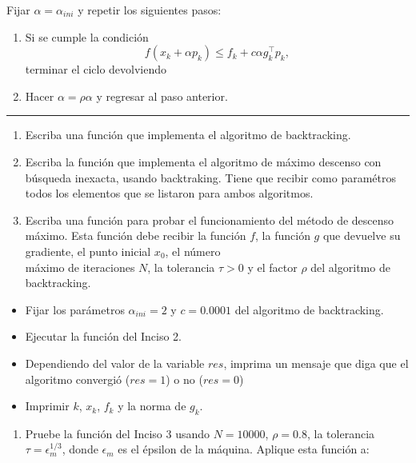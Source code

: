 \documentclass[11pt]{article}
\providecommand{\tightlist}{%
      \setlength{\itemsep}{0pt}\setlength{\parskip}{0pt}}
\begin{document}
Fijar \(\alpha = \alpha_{ini}\) y repetir los siguientes pasos:

\begin{enumerate}
\def\labelenumi{\arabic{enumi}.}
\tightlist
\item
  Si se cumple la condición
  \[ f(x_k+\alpha p_k) \leq f_k + c \alpha g_k^\top p_k, \] terminar el
  ciclo devolviendo
\item
  Hacer \(\alpha = \rho \alpha\) y regresar al paso anterior.
\end{enumerate}

\begin{center}\rule{0.5\linewidth}{0.5pt}\end{center}

\begin{enumerate}
\def\labelenumi{\arabic{enumi}.}
\tightlist
\item
  Escriba una función que implementa el algoritmo de backtracking.
\item
  Escriba la función que implementa el algoritmo de máximo descenso con
  búsqueda inexacta, usando backtraking. Tiene que recibir como
  paramétros todos los elementos que se listaron para ambos algoritmos.
\item
  Escriba una función para probar el funcionamiento del método de
  descenso máximo. Esta función debe recibir la función \(f\), la
  función \(g\) que devuelve su gradiente, el punto inicial \(x_0\), el
  número\\
  máximo de iteraciones \(N\), la tolerancia \(\tau>0\) y el factor
  \(\rho\) del algoritmo de backtracking.
\end{enumerate}

\begin{itemize}
\tightlist
\item
  Fijar los parámetros \(\alpha_{ini}=2\) y \(c=0.0001\) del algoritmo
  de backtracking.
\item
  Ejecutar la función del Inciso 2.
\item
  Dependiendo del valor de la variable \(res\), imprima un mensaje que
  diga que el algoritmo convergió (\(res=1\)) o no (\(res=0\))
\item
  Imprimir \(k\), \(x_k\), \(f_k\) y la norma de \(g_k\).
\end{itemize}

\begin{enumerate}
\def\labelenumi{\arabic{enumi}.}
\setcounter{enumi}{3}
\tightlist
\item
  Pruebe la función del Inciso 3 usando \(N=10000\), \(\rho=0.8\), la
  tolerancia \(\tau = \epsilon_m^{1/3}\), donde \(\epsilon_m\) es el
  épsilon de la máquina. Aplique esta función a:
\end{enumerate}
\end{document}
